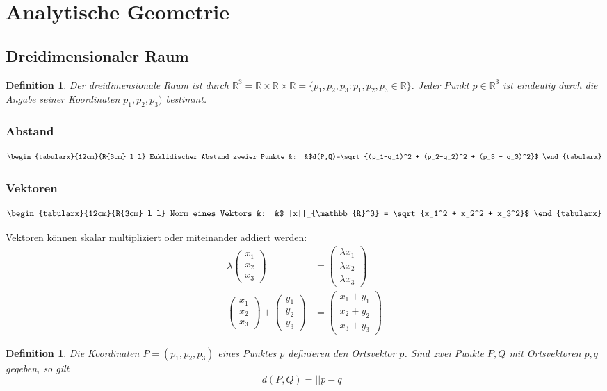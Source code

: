 \documentclass[12pt,a4paper]{report}%
\newtheorem{definition}[satz]{Definition}
\numberwithin{equation}{section}
\newcommand{\R}{\mathbb{R}} %
\def\vecT#1{\left(\begin{array}{c} #1 \end{array}\right)}
\def\formTab#1#2{
\begin{equation}
  \begin{tabularx}{12cm}{R{3cm} l l}
    #1 &: &$#2$
  \end{tabularx}
\end{equation}
}
\numberwithin{equation}{subsection}
\begin{document}
\section{Analytische Geometrie}
  \subsection{Dreidimensionaler Raum}
  \begin{definition}
    Der dreidimensionale Raum ist durch $\R^3 = \R \times \R \times \R = \lbrace p_1, p_2, p_3: p_1, p_2, p_3 \in \R \rbrace$. Jeder Punkt $p\in \R^3$ ist eindeutig durch die Angabe seiner Koordinaten $p_1, p_2, p_3)$ bestimmt.
  \end{definition}
  \subsubsection{Abstand}
  \formTab{Euklidischer Abstand zweier Punkte}{d(P,Q)=\sqrt{(p_1-q_1)^2 + (p_2-q_2)^2 + (p_3 - q_3)^2}} 
  \subsubsection{Vektoren} 
  \formTab{Norm eines Vektors}{||x||_{\R^3} = \sqrt{x_1^2 + x_2^2 + x_3^2}}
  Vektoren können skalar multipliziert oder miteinander addiert werden:
  \begin{align}
    \lambda \vecT{x_1 \\ x_2 \\ x_3} &= \vecT{\lambda x_1 \\ \lambda x_2 \\ \lambda x_3}\\
    \vecT{x_1 \\ x_2 \\ x_3} + \vecT{y_1 \\ y_2 \\ y_3} &= \vecT{x_1 + y_1 \\ x_2 + y_2 \\ x_3 + y_3}
  \end{align}   
  \begin{definition}
    Die Koordinaten $P = (p_1, p_2, p_3)$ eines Punktes $p$ definieren den Ortsvektor $p$. Sind zwei Punkte $P,Q$ mit Ortsvektoren $p,q$ gegeben, so gilt 
    \begin{equation}
      d(P,Q) = ||p-q||
    \end{equation}   
  \end{definition}  
    
\end{document}
